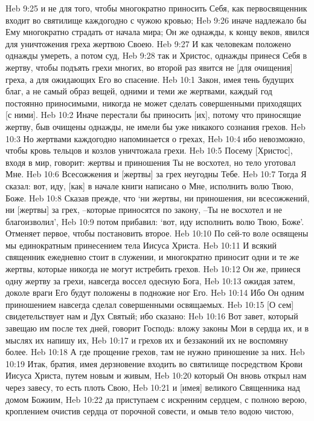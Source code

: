 Heb 9:25  и не для того, чтобы многократно приносить Себя, как первосвященник входит во святилище каждогодно с чужою кровью;
Heb 9:26  иначе надлежало бы Ему многократно страдать от начала мира; Он же однажды, к концу веков, явился для уничтожения греха жертвою Своею.
Heb 9:27  И как человекам положено однажды умереть, а потом суд,
Heb 9:28  так и Христос, однажды принеся Себя в жертву, чтобы подъять грехи многих, во второй раз явится не [для очищения] греха, а для ожидающих Его во спасение.
Heb 10:1  Закон, имея тень будущих благ, а не самый образ вещей, одними и теми же жертвами, каждый год постоянно приносимыми, никогда не может сделать совершенными приходящих [с ними].
Heb 10:2  Иначе перестали бы приносить [их], потому что приносящие жертву, быв очищены однажды, не имели бы уже никакого сознания грехов.
Heb 10:3  Но жертвами каждогодно напоминается о грехах,
Heb 10:4  ибо невозможно, чтобы кровь тельцов и козлов уничтожала грехи.
Heb 10:5  Посему [Христос], входя в мир, говорит: жертвы и приношения Ты не восхотел, но тело уготовал Мне.
Heb 10:6  Всесожжения и [жертвы] за грех неугодны Тебе.
Heb 10:7  Тогда Я сказал: вот, иду, [как] в начале книги написано о Мне, исполнить волю Твою, Боже.
Heb 10:8  Сказав прежде, что `ни жертвы, ни приношения, ни всесожжений, ни [жертвы] за грех, --которые приносятся по закону, --Ты не восхотел и не благоизволил',
Heb 10:9  потом прибавил: `вот, иду исполнить волю Твою, Боже'. Отменяет первое, чтобы постановить второе.
Heb 10:10  По сей-то воле освящены мы единократным принесением тела Иисуса Христа.
Heb 10:11  И всякий священник ежедневно стоит в служении, и многократно приносит одни и те же жертвы, которые никогда не могут истребить грехов.
Heb 10:12  Он же, принеся одну жертву за грехи, навсегда воссел одесную Бога,
Heb 10:13  ожидая затем, доколе враги Его будут положены в подножие ног Его.
Heb 10:14  Ибо Он одним приношением навсегда сделал совершенными освящаемых.
Heb 10:15  [О сем] свидетельствует нам и Дух Святый; ибо сказано:
Heb 10:16  Вот завет, который завещаю им после тех дней, говорит Господь: вложу законы Мои в сердца их, и в мыслях их напишу их,
Heb 10:17  и грехов их и беззаконий их не воспомяну более.
Heb 10:18  А где прощение грехов, там не нужно приношение за них.
Heb 10:19  Итак, братия, имея дерзновение входить во святилище посредством Крови Иисуса Христа, путем новым и живым,
Heb 10:20  который Он вновь открыл нам через завесу, то есть плоть Свою,
Heb 10:21  и [имея] великого Священника над домом Божиим,
Heb 10:22  да приступаем с искренним сердцем, с полною верою, кроплением очистив сердца от порочной совести, и омыв тело водою чистою,
